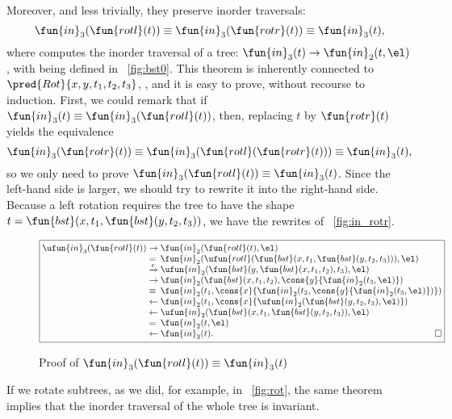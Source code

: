 Moreover, and less trivially, they preserve inorder traversals:
\begin{equation*}
  \fun{in}_3(\fun{rotl}(t)) \equiv \fun{in}_3(\fun{rotr}(t)) \equiv
  \fun{in}_3(t),
\end{equation*}
where  computes the
inorder traversal of a tree: \(\fun{in}_3(t) \rightarrow
\fun{in}_2(t,\el)\), with 
being defined in \fig~\vref{fig:bst0}. This theorem is inherently
connected to
\(\pred{Rot}{x,y,t_1,t_2,t_3}\),
, and it is easy to prove, without recourse to
induction. First, we could remark that if \(\fun{in}_3(t) \equiv
\fun{in}_3(\fun{rotl}(t))\), then, replacing \(t\) by
\(\fun{rotr}(t)\) yields the equivalence
\begin{equation*}
  \fun{in}_3(\fun{rotr}(t))
  \equiv \fun{in}_3(\fun{rotl}(\fun{rotr}(t))) \equiv \fun{in}_3(t),
\end{equation*}
so we only need to prove \(\fun{in}_3(\fun{rotl}(t)) \equiv
\fun{in}_3(t)\).  Since the left\hyp{}hand side is larger, we should
try to rewrite it into the right\hyp{}hand side. Because a left
rotation requires the tree to have the shape
\(t=\fun{bst}(x,t_1,\fun{bst}(y,t_2,t_3))\), we have the rewrites of
\fig~\vref{fig:in_rotr}.
\begin{figure}
  \begin{equation*}
    \boxed{
      \begin{array}{@{}r@{\;}l@{\;}l@{}}
  \ufun{in}_3(\fun{rotl}(t))
  & \rightarrow & \fun{in}_2(\fun{rotl}(t),\el)\\
  & = & \fun{in}_2(\ufun{rotl}(\fun{bst}(x,t_1,\fun{bst}(y,t_2,t_3))),\el)\\
  & \xrightarrow{\smash{\epsilon}} &
  \ufun{in}_2(\fun{bst}(y,\fun{bst}(x,t_1,t_2),t_3),\el)\\
  & \rightarrow &
  \fun{in}_2(\fun{bst}(x,t_1,t_2),\cons{y}{\fun{in}_2(t_3,\el)})\\
  & \equiv &
 \fun{in}_2(t_1,\cons{x}{\fun{in}_2(t_2,\cons{y}{\fun{in}_2(t_3,\el)})})\\
  & \leftarrow &
  \fun{in}_2(t_1,\cons{x}{\ufun{in}_2(\fun{bst}(y,t_2,t_3),\el)})\\
  & \leftarrow &
  \ufun{in}_2(\fun{bst}(x,t_1,\fun{bst}(y,t_2,t_3)),\el)\\
  & = &
  \fun{in}_2(t,\el)\\
  & \leftarrow &
  \fun{in}_3(t).\hfill\Box
\end{array}
}
\end{equation*}
\caption{Proof of \(\fun{in}_3(\fun{rotl}(t)) \equiv \fun{in}_3(t)\)}
\label{fig:in_rotr}
\end{figure}
If we rotate subtrees, as we did, for example, in \fig~\vref{fig:rot},
the same theorem implies that the inorder traversal of the whole tree
is invariant.

